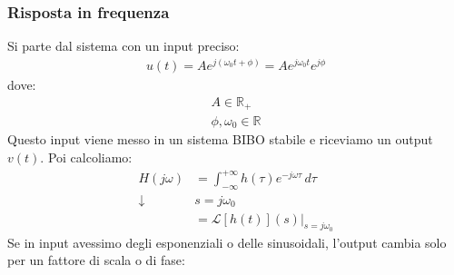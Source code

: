 \documentclass[a4paper]{article}
\begin{document}
\subsubsection{Risposta in frequenza}
Si parte dal sistema con un input preciso:
\[
  \begin{aligned}
    u(t) = A e^{j \left( \omega_0 t + \phi \right) } = A e^{j \omega_0 t} e^{j \phi}
  \end{aligned}
\] 
dove:
\[
\begin{aligned}
  A \in \mathbb{R}_+\\
  \phi,\omega_0 \in \mathbb{R}
\end{aligned}
\] 
Questo input viene messo in un sistema BIBO stabile e riceviamo un output \( v(t) \).
Poi calcoliamo:
\[
\begin{aligned}
  H(j \omega) &= \int_{- \infty}^{+ \infty} h(\tau) e^{-j \omega \tau} \,d\tau\\
  \downarrow & s = j \omega_0\\
             &= \mathcal{L}\left[ h(t) \right](s) \Bigg|_{s = j \omega_0}
\end{aligned}
\] 
Se in input avessimo degli esponenziali o delle sinusoidali, l'output cambia solo
per un fattore di scala o di fase:
\end{document}
